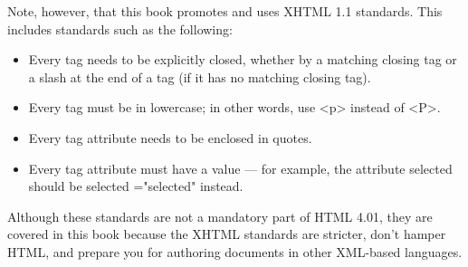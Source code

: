 Note, however, that this book promotes and uses XHTML 1.1 standards. This includes standards
such as the following:

\begin{itemize}
  \item Every tag needs to be explicitly closed, whether by a matching closing tag or a slash at the
end of a tag (if it has no matching closing tag).
  \item Every tag must be in lowercase; in other words, use <p> instead of <P>.
  \item Every tag attribute needs to be enclosed in quotes.
  \item Every tag attribute must have a value — for example, the attribute selected should be
selected ="selected" instead.
\end{itemize}
Although these standards are not a mandatory part of HTML 4.01, they are covered in this book
because the XHTML standards are stricter, don’t hamper HTML, and prepare you for authoring
documents in other XML-based languages.


